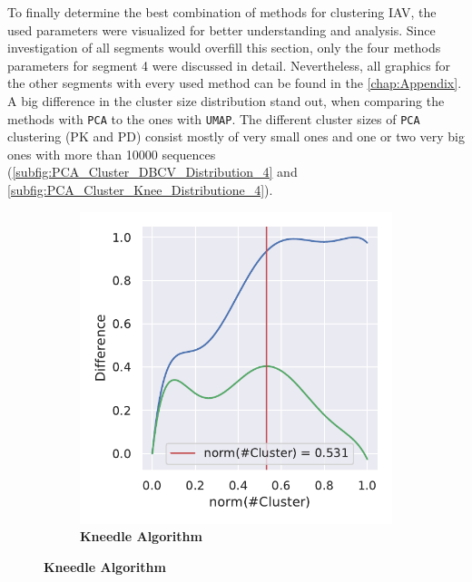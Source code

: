 To finally determine the best combination of methods for clustering \gls{IAV}, the used parameters were visualized for better understanding and analysis. Since investigation of all segments would overfill this section, only the four methods parameters for segment 4 were discussed in detail. Nevertheless, all graphics for the other segments with every used method can be found in the \autoref{chap:Appendix}. A big difference in the cluster size distribution stand out, when comparing the methods with \texttt{PCA} to the ones with \texttt{UMAP}. The different cluster sizes of \texttt{PCA} clustering (PK and PD) consist mostly of very small ones and one or two very big ones with more than 10000 sequences (\autoref{subfig:PCA_Cluster_DBCV_Distribution_4} and \autoref{subfig:PCA_Cluster_Knee_Distributione_4}). 

\begin{figure}[!hbt]
    \centering
    \begin{subfigure}[b]{0.475\textwidth}
        \caption[Kneedle Algorithm]{\textbf{Kneedle Algorithm}}
        \label{subfig:UMAP_Cluster_Knee_Kneedle_4}            \includegraphics[width=\textwidth]{UMAP/Cluster_Knee_Segment_4.pdf}
    \end{subfigure}

\end{figure}
